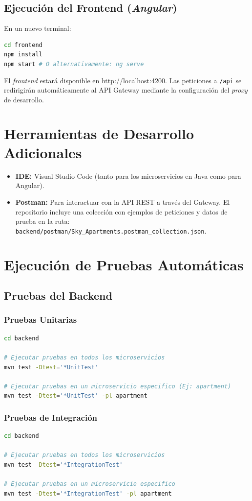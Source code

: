 \subsection{Ejecución del Frontend (\textit{Angular})}
En un nuevo terminal:
\begin{lstlisting}[language=bash]
cd frontend
npm install
npm start # O alternativamente: ng serve
\end{lstlisting}
El \textit{frontend} estará disponible en \url{http://localhost:4200}. Las peticiones a \texttt{/api} se redirigirán automáticamente al API Gateway mediante la configuración del \textit{proxy} de desarrollo.

\section{Herramientas de Desarrollo Adicionales}
\begin{itemize}
    \item \textbf{IDE:} Visual Studio Code (tanto para los microservicios en Java como para Angular).
    \item \textbf{Postman:} Para interactuar con la API REST a través del Gateway. El repositorio incluye una colección con ejemplos de peticiones y datos de prueba en la ruta: \texttt{backend/postman/Sky\_Apartments.postman\_collection.json}.
\end{itemize}

\section{Ejecución de Pruebas Automáticas}

\subsection{Pruebas del Backend}

\subsubsection*{Pruebas Unitarias}
\begin{lstlisting}[language=bash]
cd backend

# Ejecutar pruebas en todos los microservicios
mvn test -Dtest='*UnitTest'

# Ejecutar pruebas en un microservicio especifico (Ej: apartment)
mvn test -Dtest='*UnitTest' -pl apartment
\end{lstlisting}

\subsubsection*{Pruebas de Integración}
\begin{lstlisting}[language=bash]
cd backend

# Ejecutar pruebas en todos los microservicios
mvn test -Dtest='*IntegrationTest'

# Ejecutar pruebas en un microservicio especifico
mvn test -Dtest='*IntegrationTest' -pl apartment
\end{lstlisting}

